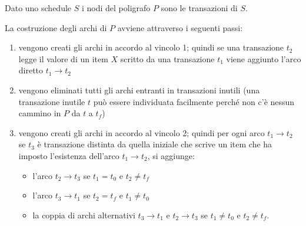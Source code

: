 \begin{defn}
Dato uno schedule $S$ i nodi del poligrafo $P$ sono le transazioni di $S$. 
\end{defn}

La costruzione degli archi di $P$ avviene attraverso i seguenti passi:
\begin{enumerate}
 \item vengono creati gli archi in accordo al vincolo 1; quindi se una transazione $t_2$ legge il valore di
un item $X$ scritto da una transazione $t_1$ viene aggiunto l'arco diretto $t_1\rightarrow t_2$
 \item vengono eliminati tutti gli archi entranti in transazioni inutili (una transazione inutile $t$ può
essere individuata facilmente perché non c'è nessun cammino in $P$ da $t$ a $t_f$)
 \item vengono creati gli archi in accordo al vincolo 2; quindi per ogni arco $t_1\rightarrow t_2$ se $t_3$ è transazione
distinta da quella iniziale che scrive un item che ha imposto l'esistenza dell'arco $t_1\rightarrow t_2$, si
aggiunge:
\begin{itemize}
 \item l'arco $t_2\rightarrow t_3$ se $t_1 = t_0$ e $t_2 \not= t_f$
 \item l'arco $t_3\rightarrow t_1$ se $t_2 = t_f$ e $t_1 \not= t_0$
 \item la coppia di archi alternativi $t_3\rightarrow t_1$ e $t_2\rightarrow t_3$ se $t_1 \not= t_0$ e $t_2 \not= t_f$.
\end{itemize}
\end{enumerate}

